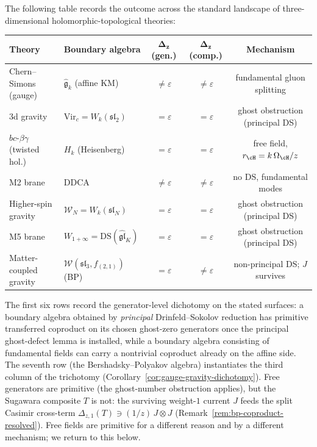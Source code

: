 The following table records the outcome across the standard
landscape of three-dimensional holomorphic-topological theories:

\begin{center}
\small
\renewcommand{\arraystretch}{1.3}
\begin{tabular}{llccc}
\textbf{Theory} & \textbf{Boundary algebra}
 & $\boldsymbol{\Delta_z}$ \textbf{(gen.)}
 & $\boldsymbol{\Delta_z}$ \textbf{(comp.)}
 & \textbf{Mechanism} \\
\hline
Chern--Simons (gauge) &
 $\widehat{\mathfrak{g}}_k$ (affine KM) &
 $\ne \varepsilon$ &
 $\ne \varepsilon$ &
 fundamental gluon splitting \\[2pt]
3d gravity &
 $\mathrm{Vir}_c = W_k(\mathfrak{sl}_2)$ &
 $= \varepsilon$ &
 $= \varepsilon$ &
 ghost obstruction (principal DS) \\[2pt]
$bc$-$\beta\gamma$ (twisted hol.) &
 $H_k$ (Heisenberg) &
 $= \varepsilon$ &
 $= \varepsilon$ &
 free field, $r_{\cH}=k\,\Omega_{\cH}/z$ \\[2pt]
M2 brane &
 DDCA &
 $\ne \varepsilon$ &
 $\ne \varepsilon$ &
 no DS, fundamental modes \\[2pt]
Higher-spin gravity &
 $\mathcal{W}_N = W_k(\mathfrak{sl}_N)$ &
 $= \varepsilon$ &
 $= \varepsilon$ &
 ghost obstruction (principal DS) \\[2pt]
M5 brane &
 $W_{1+\infty} = \mathrm{DS}(\widehat{\mathfrak{gl}}_K)$ &
 $= \varepsilon$ &
 $= \varepsilon$ &
 ghost obstruction (principal DS) \\[2pt]
\hline
\rule{0pt}{2.4ex}%
Matter-coupled gravity &
 $\mathcal{W}(\mathfrak{sl}_3, f_{(2,1)})$ (BP) &
 $= \varepsilon$ &
 $\ne \varepsilon$ &
 non-principal DS; $J$ survives \\
\end{tabular}
\end{center}

The first six rows record the generator-level dichotomy on the stated
surfaces: a boundary algebra obtained by \emph{principal}
Drinfeld--Sokolov reduction has primitive transferred coproduct on its
chosen ghost-zero generators once the principal ghost-defect lemma is
installed, while a boundary algebra consisting of fundamental fields
can carry a nontrivial coproduct already on the affine side.
The seventh row (the Bershadsky--Polyakov algebra) instantiates
the third column of the trichotomy
(Corollary~\ref{cor:gauge-gravity-dichotomy}). Free generators
are primitive (the ghost-number obstruction applies), but the
Sugawara composite $T$ is not: the surviving weight-$1$ current
$J$ feeds the split Casimir cross-term
$\Delta_{z,1}(T) \ni (1/z)\, J \otimes J$
(Remark~\ref{rem:bp-coproduct-resolved}). Free fields are
primitive for a different reason and by a different mechanism;
we return to this below.

